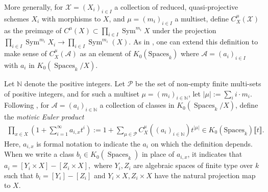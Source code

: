 \documentclass[12 pt]{amsart}
\newcommand{\rboxed}[1]{#1}
\theoremstyle{plain}
\theoremstyle{definition}
\theoremstyle{remark}
\numberwithin{equation}{section}
\newcommand\grSpaces{K_0(\mathrm{Spaces}_k)} %
\DeclareMathOperator\sym{Sym}
\newcommand{\on}[1]{\operatorname{#1}}
\begin{document}
%
More generally, for $\mathcal X = (X_i)_{i
\in I}$ a collection of reduced, quasi-projective schemes
$X_i$ with morphisms to $X$, and $\mu = (m_i)_{i \in I}$ a
multiset, define $C^\mu_{X}(\mathcal X)$ as the preimage of
$C^{\mu}(X) \subset \prod_{i \in I} \sym^{m_i}X$
under the projection
$\prod_{i
\in I} \sym^{m_i} X_i \to \prod_{i \in I} \sym^{m_i}(X)$.  
As in \cite[Defn.\
6.1.8]{biluH:motivic-euler-products-in-motivic-statistics}, one can extend this
definition to make sense of $C_{X}^\mu(\mathcal A)$ as an element of
$\grSpaces$ where $\mathcal A = (a_i)_{i \in I}$ with $a_i$ in
$K_0(\on{Spaces}_k/X)$.  

%
 Let $\mathbb N$ denote the positive integers.
 Let $\mathcal P$ be the set of non-empty finite multi-sets of positive
 integers, and for such a multiset $\mu=(m_i)_{i\in \mathbb N}$, let
 $|\mu|:=\sum_i i \cdot m_i$.
 Following 
\cite[Section 2.2.2]{Bilu2022},
for $\mathcal A =
(a_i)_{i \in \mathbb N}$ a collection of classes in $K_0(\on{Spaces}_k/X)$, define the
{\em motivic Euler product} \begin{align} 
	\label{equation:motivic-euler-product}	
	\rboxed{	\prod_{x \in X} \left(
	1 + \sum_{i =1}^{\infty} a_{i,x} t^i \right)} := 1+ \sum_{\mu \in \mathcal P}
	C^\mu_{X}((a_i)_{i\in \mathbb N}) t^{|\mu|} \in \grSpaces \llbracket
	t \rrbracket. 
\end{align}   
Here, $\rboxed{a_{i,x}}$ is formal notation to indicate the $a_i$ on which the definition depends.  When we write a class
$b_i\in K_0(\on{Spaces}_k)$ in place of $a_{i,x}$, it indicates that $a_i=[Y_i \times X]-[Z_i\times X],$ where $Y_i,Z_i$ are algebraic spaces of finite type over $k$ such that 
$b_i=[Y_i]-[Z_i]$ and $Y_i \times X,Z_i\times X$ have the natural projection map to $X$.
\end{document}
